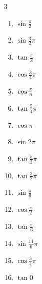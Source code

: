 \begin{multicols}{3}
\begin{enumerate}
  \item $\displaystyle \sin{\frac{\pi}{2}}$
        \phantom{$\displaystyle =1$}

  \item $\displaystyle \sin{\frac{3}{2}\pi}$
        \phantom{$\displaystyle =-1$}

  \item $\displaystyle \tan{\frac{\pi}{3}}$

  \item $\displaystyle \cos{\frac{3}{4}\pi}$

  \item $\displaystyle \cos{\frac{\pi}{6}}$

  \item $\displaystyle \tan{\frac{5}{4}\pi}$
        \phantom{$\displaystyle =1$}

  \item $\displaystyle \cos{\pi}$
        \phantom{$\displaystyle =-1$}

  \item $\displaystyle \sin{2\pi}$
        \phantom{$\displaystyle =0$}

  \item $\displaystyle \tan{\frac{5}{3}\pi}$

  \item $\displaystyle \tan{\frac{3}{2}\pi}$
        \phantom{$\displaystyle \quad なし$}

\columnbreak %

  \item $\displaystyle \sin{\frac{\pi}{6}}$

  \item $\displaystyle \cos{\frac{\pi}{2}}$
        \phantom{$\displaystyle =0$}

  \item $\displaystyle \tan{\frac{\pi}{6}}$

  \item $\displaystyle \sin{\frac{11}{6}\pi}$

  \item $\displaystyle \cos{\frac{3}{4}\pi}$

  \item $\displaystyle \tan{0}$
        \phantom{$\displaystyle =0$}


\end{enumerate}
\end{multicols}
